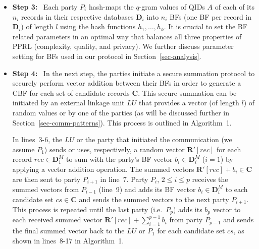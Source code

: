 \documentclass{sig-alternate}
\begin{document}
\begin{itemize}
\item \textbf{Step 3:}~
Each party $P_i$
hash-maps the $q$-gram values of QIDs $A$ of each of
its $n_i$ records in their respective databases $\mathbf{D}_i$
into $n_i$ BFs (one BF per record in $\mathbf{D}_i$) 
of length $l$ using
the hash functions $h_1, \ldots, h_k$. It is crucial
to set the BF related parameters in an optimal
way that balances all three properties of PPRL 
(complexity, quality, and privacy). We further discuss parameter
setting for BFs used in our protocol
in Section~\ref{sec-analysis}.

\item \textbf{Step 4:}~
In the next step, the parties initiate a secure summation protocol
to securely perform vector addition between their BFs in order
to generate a CBF for each set of candidate records $\mathbf{C}$.
This secure summation can be initiated 
by an external linkage unit $LU$ that provides a vector (of length $l$)
of random values 
or by one of the parties (as will be discussed 
further in Section~\ref{sec-comm-patterns}). 
This process 
is outlined in Algorithm~1.

In lines~3-6, the $LU$ or the party that initiated the communication (we assume $P_1$)
sends or uses, respectively, a random vector $\mathbf{R'}[rec]$
for each record $rec \in \mathbf{D}_1^M$
to sum
with the party's BF vector $b_i \in \mathbf{D}_i^M$ ($i=1$) 
by applying a vector addition operation.
The summed vectors $\mathbf{R'}[rec]+b_i \in \mathbf{C}$  
are then sent
to party $P_{i+1}$ 
in line~7.
Party $P_{i}$, $2 \le i \le p$ receives the summed vectors from $P_{i-1}$ (line~9)
and adds its BF vector $b_i \in \mathbf{D}_i^M$ to each candidate set
$cs \in \mathbf{C}$ 
and sends the summed vectors to the next party $P_{i+1}$.
This process is repeated until the last party (i.e.\ $P_p$)
adds its $b_p$ vector to each received summed vector
$\mathbf{R'}[rec] + \sum_{i=1}^{p-1} b_i$ from
party $P_{p-1}$ and sends the final summed vector back to the $LU$ or $P_1$
for each candidate set $cs$, 
as shown in lines~8-17 in Algorithm~1. 


\end{itemize}
\end{document}

